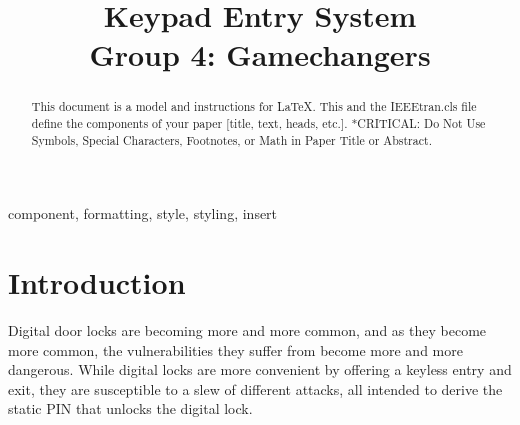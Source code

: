 \documentclass[conference]{IEEEtran}
\begin{document}
\title{Keypad Entry System\\
Group 4: Gamechangers
}

\author{
\and
{}
\and
{}
\and
{}
}

\maketitle

\begin{abstract}
This document is a model and instructions for \LaTeX.
This and the IEEEtran.cls file define the components of your paper [title, text, heads, etc.]. *CRITICAL: Do Not Use Symbols, Special Characters, Footnotes, 
or Math in Paper Title or Abstract.
\end{abstract}

\begin{IEEEkeywords}
component, formatting, style, styling, insert
\end{IEEEkeywords}

\section{Introduction}
Digital door locks are becoming more and more common, and as they become more common, the vulnerabilities they suffer from become more and more dangerous. While digital locks are more convenient by offering a keyless entry and exit, they are susceptible to a slew of different attacks, all intended to derive the static PIN that unlocks the digital lock.
\end{document}
